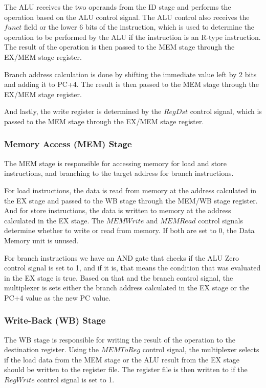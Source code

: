The ALU receives the two operands from the ID stage and performs the operation based on the ALU control signal. The ALU control also receives the $funct$ field or the lower 6 bits of the instruction, which is used to determine the operation to be performed by the ALU if the instruction is an R-type instruction. The result of the operation is then passed to the MEM stage through the EX/MEM stage register.

Branch address calculation is done by shifting the immediate value left by 2 bits and adding it to PC+4. The result is then passed to the MEM stage through the EX/MEM stage register.

And lastly, the write register is determined by the $RegDst$ control signal, which is passed to the MEM stage through the EX/MEM stage register.


\subsubsection{Memory Access (MEM) Stage}
The MEM stage is responsible for accessing memory for load and store instructions, and branching to the target address for branch instructions.

For load instructions, the data is read from memory at the address calculated in the EX stage and passed to the WB stage through the MEM/WB stage register. And for store instructions, the data is written to memory at the address calculated in the EX stage. The $MEMWrite$ and $MEMRead$ control signals determine whether to write or read from memory. If both are set to 0, the Data Memory unit is unused.

For branch instructions we have an AND gate that checks if the ALU Zero control signal is set to 1, and if it is, that means the condition that was evaluated in the EX stage is true. Based on that and the branch control signal, the multiplexer is sets either the branch address calculated in the EX stage or the PC+4 value as the new PC value.

\subsubsection{Write-Back (WB) Stage}
The WB stage is responsible for writing the result of the operation to the destination register. Using the $MEMToReg$ control signal, the multiplexer selects if the load data from the MEM stage or the ALU result from the EX stage should be written to the register file. The register file is then written to if the $RegWrite$ control signal is set to 1.

